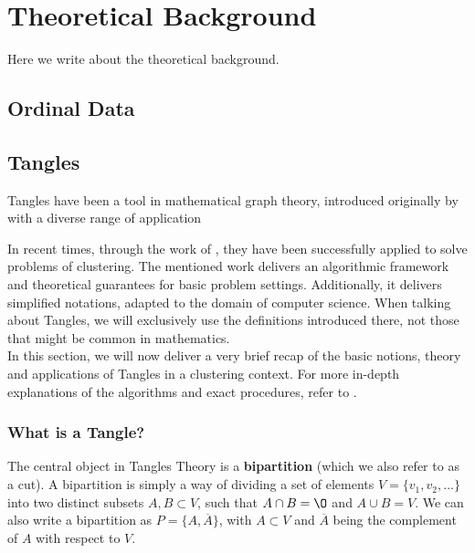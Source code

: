 \chapter{Theoretical Background}\label{theory}
Here we write about the theoretical background.
\section{Ordinal Data}

\section{Tangles}
Tangles have been a tool in mathematical graph theory, introduced originally by \cite{robertsonGraphMinorsObstructions1991} 
with a diverse range of application %

In recent times, through the work of \cite{klepperClusteringTanglesAlgorithmitc2020}, they have been successfully applied
to solve problems of clustering. The mentioned work delivers an algorithmic framework and theoretical guarantees for basic problem settings.
Additionally, it delivers simplified notations, adapted to the domain of computer science. When talking about Tangles,
we will exclusively use the definitions introduced there, not those that might be common in mathematics. \\

In this section, we will now deliver a very brief recap of the basic notions, theory and applications of Tangles in a clustering context.
For more in-depth explanations of the algorithms and exact procedures, refer to \cite{klepperClusteringTanglesAlgorithmic2020A}.
\subsection{What is a Tangle?}
The central object in Tangles Theory is a \textbf{bipartition} (which we also refer to as a cut). 
A bipartition is simply a way of dividing a set of elements $V =  \{ v_1, v_2, \ldots \}$ into two distinct subsets $A, B \subset V$, such that
$A \cap B = \O$ and $A \cup B = V$. We can also write a bipartition as $P = \{A, \overline{A}\}$, with $A \subset V$ and $\overline{A}$ being the
complement of $A$ with respect to $V$. \\

